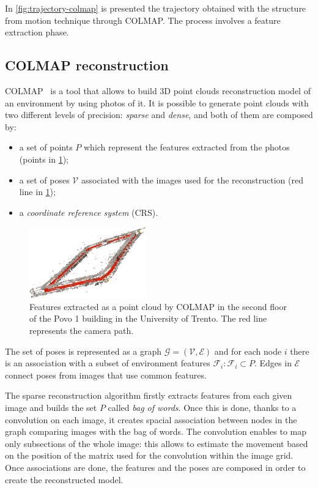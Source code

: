 In \cref{fig:trajectory-colmap} is presented the trajectory obtained with the structure from motion technique through COLMAP. The process involves a feature extraction phase.

\subsection{COLMAP reconstruction}
COLMAP~\cite{colmap} is a tool that allows to build 3D point clouds reconstruction model of an environment by using photos of it. It is possible to generate point clouds with two different levels of precision: \emph{sparse} and \emph{dense}, and both of them are composed by:
\begin{itemize}
    \item a set of points $P$ which represent the features extracted from the photos (points in \cref{fig:features-colmap});
    \item a set of poses $\mathcal{V}$ associated with the images used for the reconstruction (red line in \cref{fig:features-colmap});
    \item a \emph{coordinate reference system} (CRS).
\end{itemize}

\begin{figure}[htbp]
    \begin{center}
        \includegraphics[width=0.45\textwidth]{./imgs/extracted_features_colmap.png}
    \end{center}
    \caption{Features extracted as a point cloud by COLMAP in the second floor of the Povo 1 building in the University of Trento. The red line represents the camera path.}
    \label{fig:features-colmap}
\end{figure}

The set of poses is represented as a graph $\mathcal{G}=(\mathcal{V}, \mathcal{E})$ and for each node $i$ there is an association with a subset of environment features $\mathcal{F}_i : \mathcal{F}_i\subset P$. Edges in $\mathcal{E}$ connect poses from images that use common features.

The sparse reconstruction algorithm firstly extracts features from each given image and builds the set $P$ called \emph{bag of words}. Once this is done, thanks to a convolution on each image, it creates spacial association between nodes in the graph comparing images with the bag of words. The convolution enables to map only subsections of the whole image: this allows to estimate the movement based on the position of the matrix used for the convolution within the image grid. Once associations are done, the features and the poses are composed in order to create the reconstructed model.

